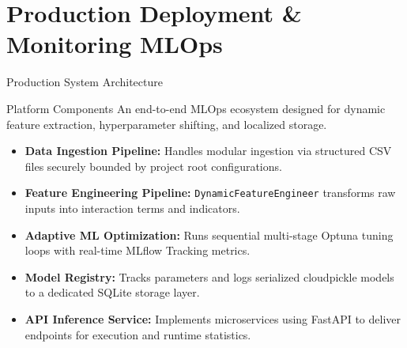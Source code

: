 \section{Production Deployment \& Monitoring MLOps}

\begin{frame}{Production System Architecture}
    \begin{block}{Platform Components}
        An end-to-end MLOps ecosystem designed for dynamic feature extraction, hyperparameter shifting, and localized storage.
    \end{block}
    \begin{itemize}\scriptsize
        \item \textbf{Data Ingestion Pipeline:} Handles modular ingestion via structured CSV files securely bounded by project root configurations.
        \item \textbf{Feature Engineering Pipeline:} \texttt{DynamicFeatureEngineer} transforms raw inputs into interaction terms and indicators.
        \item \textbf{Adaptive ML Optimization:} Runs sequential multi-stage Optuna tuning loops with real-time MLflow Tracking metrics.
        \item \textbf{Model Registry:} Tracks parameters and logs serialized cloudpickle models to a dedicated SQLite storage layer.
        \item \textbf{API Inference Service:} Implements microservices using FastAPI to deliver endpoints for execution and runtime statistics.
    \end{itemize}
\end{frame}

